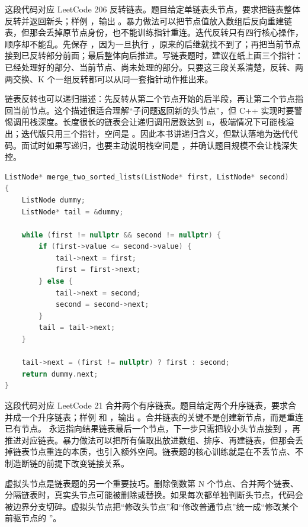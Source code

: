 这段代码对应 LeetCode 206 反转链表。题目给定单链表头节点，要求把链表整体反转并返回新头；样例 ，输出 。暴力做法可以把节点值放入数组后反向重建链表，但那会丢掉原节点身份，也不能训练指针重连。迭代反转只有四行核心操作，顺序却不能乱。先保存 ，因为一旦执行 ，原来的后继就找不到了；再把当前节点接到已反转部分前面；最后整体向后推进。写链表题时，建议在纸上画三个指针：已经处理好的部分、当前节点、尚未处理的部分。只要这三段关系清楚，反转、两两交换、K 个一组反转都可以从同一套指针动作推出来。

链表反转也可以递归描述：先反转从第二个节点开始的后半段，再让第二个节点指回当前节点。这个描述很适合理解“子问题返回新的头节点”，但 C++ 实现时要警惕调用栈深度。长度很长的链表会让递归调用层数达到 n，极端情况下可能栈溢出；迭代版只用三个指针，空间是 。因此本书讲递归含义，但默认落地为迭代代码。面试时如果写递归，也要主动说明栈空间是 ，并确认题目规模不会让栈深失控。

\begin{lstlisting}[language=C++,caption={LeetCode 21 合并两个有序链表：迭代重连节点}]
ListNode* merge_two_sorted_lists(ListNode* first, ListNode* second)
{
    ListNode dummy;
    ListNode* tail = &dummy;

    while (first != nullptr && second != nullptr) {
        if (first->value <= second->value) {
            tail->next = first;
            first = first->next;
        } else {
            tail->next = second;
            second = second->next;
        }
        tail = tail->next;
    }

    tail->next = (first != nullptr) ? first : second;
    return dummy.next;
}
\end{lstlisting}

这段代码对应 LeetCode 21 合并两个有序链表。题目给定两个升序链表，要求合并成一个升序链表；样例  和 ，输出 。合并链表的关键不是创建新节点，而是重连已有节点。  永远指向结果链表最后一个节点，下一步只需把较小头节点接到 ，再推进对应链表。暴力做法可以把所有值取出放进数组、排序、再建链表，但那会丢掉链表节点重连的本质，也引入额外空间。链表题的核心训练就是在不丢节点、不制造断链的前提下改变链接关系。

虚拟头节点是链表题的另一个重要技巧。删除倒数第 N 个节点、合并两个链表、分隔链表时，真实头节点可能被删除或替换。如果每次都单独判断头节点，代码会被边界分支切碎。虚拟头节点把“修改头节点”和“修改普通节点”统一成“修改某个前驱节点的 ”。

